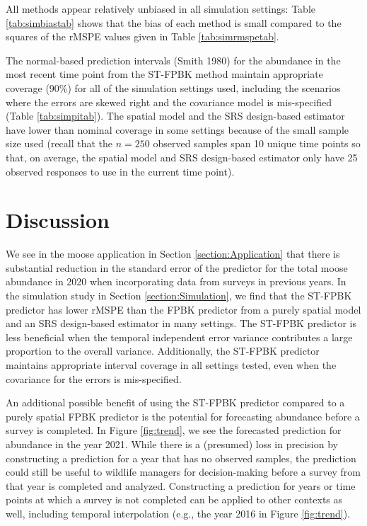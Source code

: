 \documentclass[smallextended]{svjour3}       %
\begin{document}
All methods appear relatively unbiased in all simulation settings: Table
\ref{tab:simbiastab} shows that the bias of each method is small
compared to the squares of the rMSPE values given in Table
\ref{tab:simrmspetab}.

The normal-based prediction intervals (Smith 1980) for the abundance in
the most recent time point from the ST-FPBK method maintain appropriate
coverage (90\%) for all of the simulation settings used, including the
scenarios where the errors are skewed right and the covariance model is
mis-specified (Table \ref{tab:simpitab}). The spatial model and the SRS
design-based estimator have lower than nominal coverage in some settings
because of the small sample size used (recall that the \(n = 250\)
observed samples span 10 unique time points so that, on average, the
spatial model and SRS design-based estimator only have 25 observed
responses to use in the current time point).

\hypertarget{section:Discussion}{%
\section{Discussion}\label{section:Discussion}}

We see in the moose application in Section \ref{section:Application}
that there is substantial reduction in the standard error of the
predictor for the total moose abundance in 2020 when incorporating data
from surveys in previous years. In the simulation study in Section
\ref{section:Simulation}, we find that the ST-FPBK predictor has lower
rMSPE than the FPBK predictor from a purely spatial model and an SRS
design-based estimator in many settings. The ST-FPBK predictor is less
beneficial when the temporal independent error variance contributes a
large proportion to the overall variance. Additionally, the ST-FPBK
predictor maintains appropriate interval coverage in all settings
tested, even when the covariance for the errors is mis-specified.

An additional possible benefit of using the ST-FPBK predictor compared
to a purely spatial FPBK predictor is the potential for forecasting
abundance before a survey is completed. In Figure \ref{fig:trend}, we
see the forecasted prediction for abundance in the year 2021. While
there is a (presumed) loss in precision by constructing a prediction for
a year that has no observed samples, the prediction could still be
useful to wildlife managers for decision-making before a survey from
that year is completed and analyzed. Constructing a prediction for years
or time points at which a survey is not completed can be applied to
other contexts as well, including temporal interpolation (e.g., the year
2016 in Figure \ref{fig:trend}).
\end{document}
